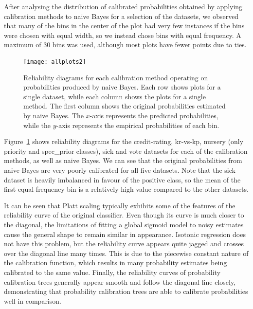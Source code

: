 \documentclass[wcp]{jmlr}
\begin{document}
After analysing the distribution of calibrated probabilities obtained by applying calibration methods to naive Bayes for a selection of the datasets, we observed that many of the bins in the center of the plot had very few instances if the bins were chosen with equal width, so we instead chose bins with equal frequency. A maximum of 30 bins was used, although most plots have fewer points due to ties.

	\begin{figure}[p!]
	    \centering
	    \texttt{[image: allplots2]}~~~
	    \caption{\label{fig:reliability_diagrams}Reliability diagrams for each calibration method operating on probabilities produced by naive Bayes. Each row shows plots for a single dataset, while each column shows the plots for a single method. The first column shows the original probabilities estimated by naive Bayes. The $x$-axis represents the predicted probabilities, while the $y$-axis represents the empirical probabilities of each bin.}
	\end{figure}

Figure~\ref{fig:reliability_diagrams} shows reliability diagrams for the credit-rating, kr-vs-kp, nursery (only priority and spec\_prior classes), sick and vote datasets for each of the calibration methods, as well as naive Bayes. We can see that the original probabilities from naive Bayes are very poorly calibrated for all five datasets. Note that the sick dataset is heavily imbalanced in favour of the positive class, so the mean of the first equal-frequency bin is a relatively high value compared to the other datasets. 

It can be seen that Platt scaling typically exhibits some of the features of the reliability curve of the original classifier. Even though its curve is much closer to the diagonal, the limitations of fitting a global sigmoid model to noisy estimates cause the general shape to remain similar in appearance. Isotonic regression does not have this problem, but the reliability curve appears quite jagged and crosses over the diagonal line many times. This is due to the piecewise constant nature of the calibration function, which results in many probability estimates being calibrated to the same value. Finally, the reliability curves of probability calibration trees generally appear smooth and follow the diagonal line closely, demonstrating that probability calibration trees are able to calibrate probabilities well in comparison.
\end{document}
